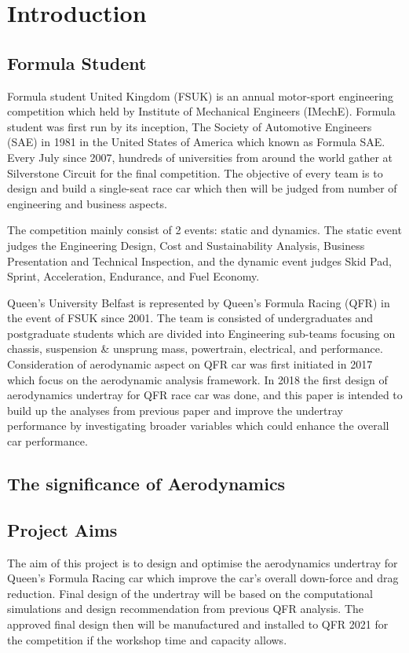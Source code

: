 \justifying
\noindent

\section{Introduction}
\subsection{Formula Student}
Formula student United Kingdom (FSUK) is an annual motor-sport engineering competition which held by Institute of Mechanical Engineers (IMechE). Formula student was first run by its inception, The Society of Automotive Engineers (SAE) in 1981 in the United States of America which known as Formula SAE. Every July since 2007, hundreds of universities from around the world gather at Silverstone Circuit for the final competition. The objective of every team is to design and build a single-seat race car which then will be judged from number of engineering and business aspects.

The competition mainly consist of 2 events: static and dynamics. The static event judges the Engineering  Design,  Cost  and  Sustainability  Analysis, Business Presentation and Technical Inspection, and the dynamic event judges Skid Pad, Sprint, Acceleration, Endurance, and Fuel Economy.

Queen's University Belfast is represented by Queen's Formula Racing (QFR) in the event of FSUK since 2001. The team is consisted of undergraduates and postgraduate students which are divided into Engineering sub-teams focusing on chassis, suspension \& unsprung mass, powertrain, electrical, and performance. Consideration of aerodynamic aspect on QFR car was first initiated in 2017 which focus on the aerodynamic analysis framework. In 2018 the first design of aerodynamics undertray for QFR race car was done, and this paper is intended to build up the analyses from previous paper and improve the undertray performance by investigating broader variables which could enhance the overall car performance.  

\subsection{The significance of Aerodynamics}



\subsection{Project Aims}
The aim of this project is to design and optimise the aerodynamics undertray for Queen's Formula Racing car which improve the car's overall down-force and drag reduction. Final design of the undertray will be based on the computational simulations and design recommendation from previous QFR analysis. The approved final design then will be manufactured and installed to QFR 2021 for the competition if the workshop time and capacity allows.